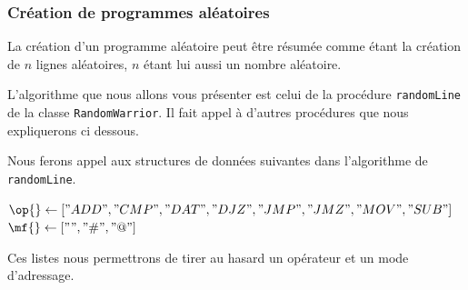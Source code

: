\documentclass[hidelinks]{report}
\begin{document}
\subsubsection{Création de programmes aléatoires\label{subsubsec:alea}}
La création d'un programme aléatoire peut être résumée comme étant la création de $n$ lignes aléatoires, $n$ étant lui aussi un nombre aléatoire.

L'algorithme que nous allons vous présenter est celui de la procédure \texttt{randomLine} de la classe \texttt{RandomWarrior}. Il fait appel à d'autres procédures que nous expliquerons ci dessous. 

Nous ferons appel aux structures de données suivantes dans l'algorithme de \texttt{randomLine}. 

\LinesNotNumbered
\begin{algorithm}[H]

$\op{} \gets ["ADD","CMP","DAT","DJZ","JMP","JMZ","MOV","SUB"]$\;
$\mf{} \gets ["","\#","@"]$\;
\end{algorithm}

Ces listes nous permettrons de tirer au hasard un opérateur et un mode d'adressage. 
\end{document}
